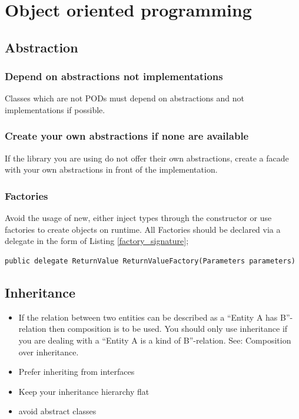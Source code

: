 \documentclass[11pt,a4paper]{article}
\begin{document}
\section{Object oriented programming}

\subsection{Abstraction}

\subsubsection{Depend on abstractions not implementations}

Classes which are not PODs must depend on abstractions and not implementations if possible.

\subsubsection{Create your own abstractions if none are available}

If the library you are using do not offer their own abstractions, create a facade with your own abstractions in front of the implementation.

\subsubsection{Factories}

Avoid the usage of new, either inject types through the constructor or use factories to create objects on runtime. All Factories should be declared via a delegate in the form of Listing \ref{factory_signature};

\begin{lstlisting}[language={[Sharp]C}, caption={Signature of factories},label={factory_signature}]
public delegate ReturnValue ReturnValueFactory(Parameters parameters)
\end{lstlisting}


\subsection{Inheritance}

\begin{itemize}[itemsep=0pt]
    \item If the relation between two entities can be described as a \enquote{Entity A has B}-relation then composition is to be used. You should only use inheritance if you are dealing with a \enquote{Entity A is a kind of B}-relation. See: Composition over inheritance.
    \item Prefer inheriting from interfaces
    \item Keep your inheritance hierarchy flat
		\item avoid abstract classes
\end{itemize}
\end{document}
